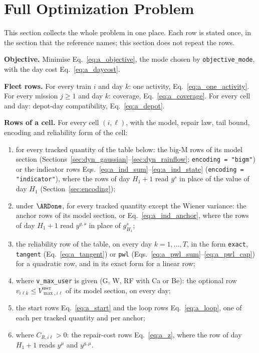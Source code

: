 \section{Full Optimization Problem}
\label{sec:full_problem}

This section collects the whole problem in one place. Each row is stated once, in the
section that the reference names; this section does not repeat the rows.

\textbf{Objective.} Minimise Eq.~\eqref{eq:a_objective}, the mode chosen by
\texttt{objective\_mode}, with the day cost Eq.~\eqref{eq:a_daycost}.

\textbf{Fleet rows.} For every train $i$ and day $k$: one activity,
Eq.~\eqref{eq:a_one_activity}. For every mission $j \geq 1$ and day $k$: coverage,
Eq.~\eqref{eq:a_coverage}. For every cell and day: depot-day compatibility,
Eq.~\eqref{eq:a_depot}.

\textbf{Rows of a cell.} For every cell $(i,\ell)$, with the model, repair law,
tail bound, encoding and reliability form of the cell:
\begin{enumerate}[nosep,leftmargin=2em]
  \item for every tracked quantity of the table below: the big-M rows of its model
        section (Sections~\ref{sec:dyn_gaussian}--\ref{sec:dyn_rainflow};
        \texttt{encoding = "bigm"}) or the indicator rows
        Eqs.~\eqref{eq:a_ind_sum}--\eqref{eq:a_ind_state} (\texttt{encoding = "indicator"}),
        where the rows of day $H_1 + 1$ read $y^s$ in place of the value of day $H_1$
        (Section~\ref{sec:encoding});
  \item under $\ARDone$, for every tracked quantity except the Wiener variance: the
        anchor rows of its model section, or Eq.~\eqref{eq:a_ind_anchor}, where the rows
        of day $H_1 + 1$ read $y^{g,s}$ in place of $g^s_{H_1}$;
  \item the reliability row of the table, on every day $k = 1, \ldots, T$, in the form
        \texttt{exact}, \texttt{tangent} (Eq.~\eqref{eq:a_tangent}) or \texttt{pwl}
        (Eqs.~\eqref{eq:a_pwl_sum}--\eqref{eq:a_pwl_cap}) for a quadratic row, and in
        its exact form for a linear row;
  \item where \texttt{v\_max\_user} is given (G, W, RF with Ca or Be): the optional row
        $v_{i\ell k} \leq V^{\mathrm{user}}_{\max,i\ell}$ of its model section, on every day;
  \item the start rows Eq.~\eqref{eq:a_start} and the loop rows Eq.~\eqref{eq:a_loop},
        one of each per tracked quantity and per anchor;
  \item where $C_{R,i\ell} > 0$: the repair-cost rows Eq.~\eqref{eq:a_z}, where the row
        of day $H_1 + 1$ reads $y^{\mu}$ and $y^{g,\mu}$.
\end{enumerate}

